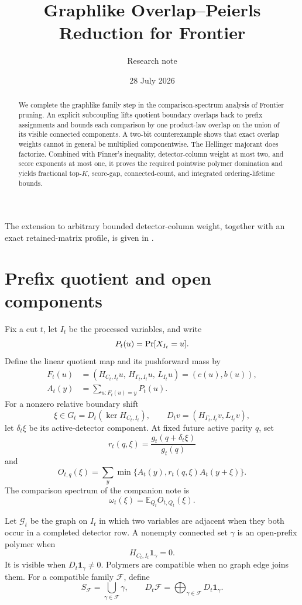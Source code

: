 \documentclass[11pt]{article}
\title{Graphlike Overlap--Peierls Reduction for Frontier}
\author{Research note}
\date{28 July 2026}
\newcommand{\E}{\mathbb E}
\newcommand{\Prb}{\mathop{\rm Pr}}
\newcommand{\1}{\mathbf 1}
\begin{document}
\maketitle

\begin{abstract}
We complete the graphlike family step in the comparison-spectrum analysis of
Frontier pruning.  An explicit subcoupling lifts quotient boundary overlaps
back to prefix assignments and bounds each comparison by one product-law
overlap on the union of its visible connected components.  A two-bit
counterexample shows that exact overlap weights cannot in general be
multiplied componentwise.  The Hellinger majorant does factorize.  Combined
with Finner's inequality, detector-column weight at most two, and score
exponents at most one, it proves the required pointwise polymer domination
and yields fractional top-\(K\), score-gap, connected-count, and integrated
ordering-lifetime bounds.
\end{abstract}

The extension to arbitrary bounded detector-column weight, together with an
exact retained-matrix profile, is given in
\texttt{}.

\section{Prefix quotient and open components}

Fix a cut \(t\), let \(I_t\) be the processed variables, and write
\[
 P_t(u)=\Prb[X_{I_t}=u].
\]
Define the linear quotient map and its pushforward mass by
\[
\begin{split}
 F_t(u)
 &=
 \left(
 H_{C_t,I_t}u,\,
 H_{\Gamma_t,I_t}u,\,
 L_{I_t}u
 \right)
 =(c(u),b(u)),\\
 A_t(y)&=\sum_{u:F_t(u)=y}P_t(u).
\end{split}
\tag{1}
\]
For a nonzero relative boundary shift
\[
 \xi\in G_t=D_t(\ker H_{C_t,I_t}),\qquad
 D_tv=(H_{\Gamma_t,I_t}v,L_{I_t}v),
\]
let \(\delta_t\xi\) be its active-detector component.  At fixed future
active parity \(q\), set
\[
 r_t(q,\xi)=\frac{g_t(q+\delta_t\xi)}{g_t(q)}
\tag{2}
\]
and
\[
 O_{t,q}(\xi)
 =
 \sum_y\min\{A_t(y),r_t(q,\xi)A_t(y+\xi)\}.
\tag{3}
\]
The comparison spectrum of the companion note is
\[
 \omega_t(\xi)=\E_{Q_t}O_{t,Q_t}(\xi).
\tag{4}
\]

Let \(\mathcal G_t\) be the graph on \(I_t\) in which two variables are
adjacent when they both occur in a completed detector row.  A nonempty
connected set \(\gamma\) is an open-prefix polymer when
\[
 H_{C_t,I_t}\1_\gamma=0.
\tag{5}
\]
It is visible when \(D_t\1_\gamma\ne0\).  Polymers are compatible when no
graph edge joins them.  For a compatible family \(\mathcal F\), define
\[
 S_{\mathcal F}=\bigcup_{\gamma\in\mathcal F}\gamma,\qquad
 D_t\mathcal F
 =
 \bigoplus_{\gamma\in\mathcal F}D_t\1_\gamma.
\tag{6}
\]
\end{document}
